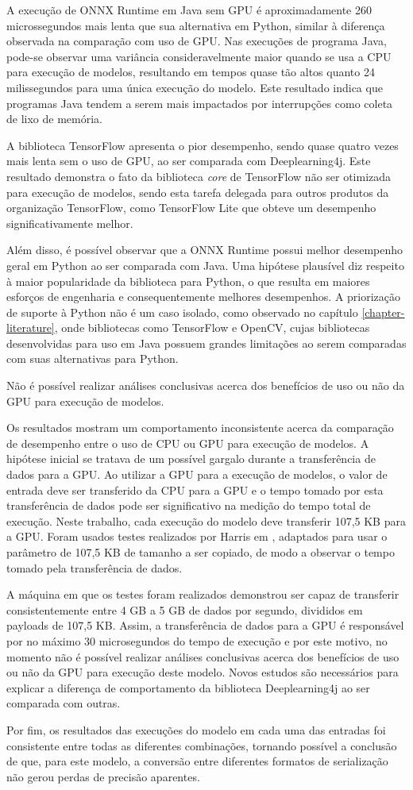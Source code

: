 A execução de ONNX Runtime em Java sem GPU é aproximadamente 260 microssegundos mais lenta que sua alternativa em Python, similar à diferença observada na comparação com uso de GPU. Nas execuções de programa Java, pode-se observar uma variância consideravelmente maior quando se usa a CPU para execução de modelos, resultando em tempos quase tão altos quanto 24 milissegundos para uma única execução do modelo. Este resultado indica que programas Java tendem a serem mais impactados por interrupções como coleta de lixo de memória.

A biblioteca TensorFlow apresenta o pior desempenho, sendo quase quatro vezes mais lenta sem o uso de GPU, ao ser comparada com Deeplearning4j. Este resultado demonstra o fato da biblioteca \textit{core} de TensorFlow não ser otimizada para execução de modelos, sendo esta tarefa delegada para outros produtos da organização TensorFlow, como TensorFlow Lite que obteve um desempenho significativamente melhor.

Além disso, é possível observar que a ONNX Runtime possui melhor desempenho geral em Python ao ser comparada com Java. Uma hipótese plausível diz respeito à maior popularidade da biblioteca para Python, o que resulta em maiores esforços de engenharia e consequentemente melhores desempenhos. A priorização de suporte à Python não é um caso isolado, como observado no capítulo \ref{chapter-literature}, onde bibliotecas como TensorFlow e OpenCV, cujas bibliotecas desenvolvidas para uso em Java possuem grandes limitações ao serem comparadas com suas alternativas para Python.

Não é possível realizar análises conclusivas acerca dos benefícios de uso ou não da GPU para execução de modelos.

Os resultados mostram um comportamento inconsistente acerca da comparação de desempenho entre o uso de CPU ou GPU para execução de modelos. A hipótese inicial se tratava de um possível gargalo durante a transferência de dados para a GPU. Ao utilizar a GPU para a execução de modelos, o valor de entrada deve ser transferido da CPU para a GPU e o tempo tomado por esta transferência de dados pode ser significativo na medição do tempo total de execução. Neste trabalho, cada execução do modelo deve transferir 107,5 KB para a GPU. Foram usados testes realizados por Harris em \cite{harris_2012}, adaptados para usar o parâmetro de 107,5 KB de tamanho a ser copiado, de modo a observar o tempo tomado pela transferência de dados.

A máquina em que os testes foram realizados demonstrou ser capaz de transferir consistentemente entre 4 GB a 5 GB de dados por segundo, divididos em payloads de 107,5 KB. Assim, a transferência de dados para a GPU é responsável por no máximo 30 microsegundos do tempo de execução e por este motivo, no momento não é possível realizar análises conclusivas acerca dos benefícios de uso ou não da GPU para execução deste modelo. Novos estudos são necessários para explicar a diferença de comportamento da biblioteca Deeplearning4j ao ser comparada com outras.

Por fim, os resultados das execuções do modelo em cada uma das entradas foi consistente entre todas as diferentes combinações, tornando possível a conclusão de que, para este modelo, a conversão entre diferentes formatos de serialização não gerou perdas de precisão aparentes.